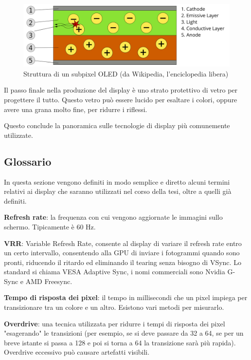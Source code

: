 \begin{figure}[h]
	\centering
	\includegraphics[width=\textwidth]{Chapter01/res/oled.png}
	\caption{Struttura di un subpixel OLED (da Wikipedia, l'enciclopedia libera)}
	\label{fig:oled}
\end{figure}

Il passo finale nella produzione del display è uno strato protettivo di vetro per progettere il tutto. Questo vetro può essere lucido per esaltare i colori, oppure avere una grana molto fine, per ridurre i riflessi.

Questo conclude la panoramica sulle tecnologie di display più comunemente utilizzate.

\subsection{Glossario}
In questa sezione vengono definiti in modo semplice e diretto alcuni termini relativi ai display che saranno utilizzati nel corso della tesi, oltre a quelli già definiti.

\textbf{Refresh rate}: la frequenza con cui vengono aggiornate le immagini sullo schermo. Tipicamente è 60 Hz.

\textbf{VRR}: Variable Refresh Rate, consente al display di variare il refresh rate entro un certo intervallo, consentendo alla GPU di inviare i fotogrammi quando sono pronti, riducendo il ritardo ed eliminando il tearing senza bisogno di VSync. Lo standard si chiama VESA Adaptive Sync, i nomi commerciali sono Nvidia G-Sync e AMD Freesync.

\textbf{Tempo di risposta dei pixel}: il tempo in millisecondi che un pixel impiega per transizionare tra un colore e un altro. Esistono vari metodi per misurarlo.

\textbf{Overdrive}: una tecnica utilizzata per ridurre i tempi di risposta dei pixel "esagerando" le transizioni (per esempio, se si deve passare da 32 a 64, se per un breve istante si passa a 128 e poi si torna a 64 la transizione sarà più rapida). Overdrive eccessivo può causare artefatti visibili.

